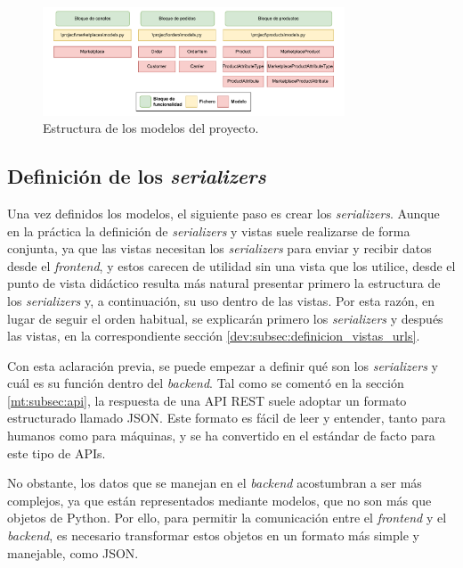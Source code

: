 \begin{figure}[H]
    \centering
    \includegraphics[width=0.8\textwidth]{figures/design_develop/estructura_modelos.pdf}
    \caption{Estructura de los modelos del proyecto.}
    \label{dev:fig:estructura_modelos}
\end{figure}

\subsection{Definición de los \textit{serializers}}
\label{dev:subsec:definicion_serializers}

Una vez definidos los modelos, el siguiente paso es crear los \textit{serializers}. Aunque en la práctica la definición de \textit{serializers} y vistas suele realizarse de forma conjunta, ya que las vistas necesitan los \textit{serializers} para enviar y recibir datos desde el \textit{frontend}, y estos carecen de utilidad sin una vista que los utilice, desde el punto de vista didáctico resulta más natural presentar primero la estructura de los \textit{serializers} y, a continuación, su uso dentro de las vistas. Por esta razón, en lugar de seguir el orden habitual, se explicarán primero los \textit{serializers} y después las vistas, en la correspondiente sección \ref{dev:subsec:definicion_vistas_urls}.

Con esta aclaración previa, se puede empezar a definir qué son los \textit{serializers} y cuál es su función dentro del \textit{backend}. Tal como se comentó en la sección \ref{mt:subsec:api}, la respuesta de una API REST suele adoptar un formato estructurado llamado JSON. Este formato es fácil de leer y entender, tanto para humanos como para máquinas, y se ha convertido en el estándar de facto para este tipo de APIs.

No obstante, los datos que se manejan en el \textit{backend} acostumbran a ser más complejos, ya que están representados mediante modelos, que no son más que objetos de Python. Por ello, para permitir la comunicación entre el \textit{frontend} y el \textit{backend}, es necesario transformar estos objetos en un formato más simple y manejable, como JSON.

